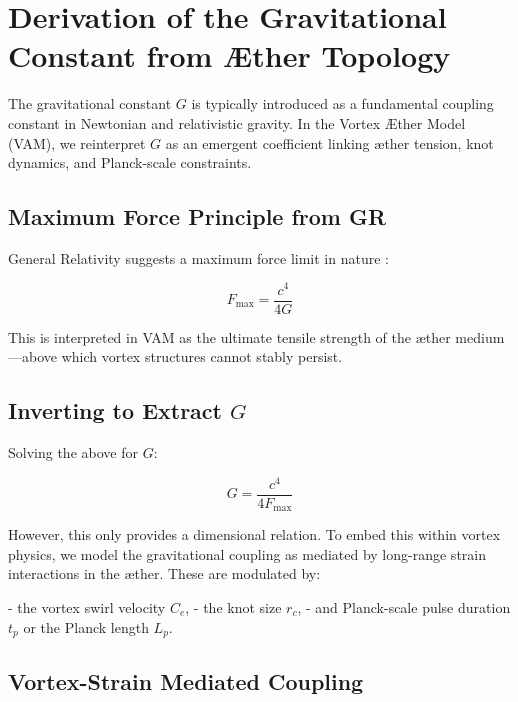 
\section{Derivation of the Gravitational Constant from Æther Topology}
\label{appendix:G}

The gravitational constant \( G \) is typically introduced as a fundamental coupling constant in Newtonian and relativistic gravity. In the Vortex Æther Model (VAM), we reinterpret \( G \) as an emergent coefficient linking æther tension, knot dynamics, and Planck-scale constraints.

\subsection*{Maximum Force Principle from GR}

General Relativity suggests a maximum force limit in nature \cite{scharf2016force, barcelo2011}:

\begin{equation}
    F_{\text{max}} = \frac{c^4}{4G}
\end{equation}

This is interpreted in VAM as the ultimate tensile strength of the æther medium—above which vortex structures cannot stably persist.

\subsection*{Inverting to Extract \( G \)}

Solving the above for \( G \):

\begin{equation}
    G = \frac{c^4}{4 F_{\text{max}}}
\end{equation}

However, this only provides a dimensional relation. To embed this within vortex physics, we model the gravitational coupling as mediated by long-range strain interactions in the æther. These are modulated by:

- the vortex swirl velocity \( C_e \),
- the knot size \( r_c \),
- and Planck-scale pulse duration \( t_p \) or the Planck length \( L_p \).

\subsection*{Vortex-Strain Mediated Coupling}

